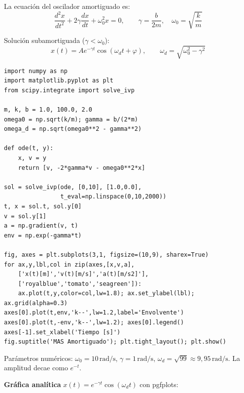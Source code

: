\documentclass[12pt, a4paper, oneside]{book}
\newcommand{\ddt}[1]{\dfrac{d#1}{dt}}
\newcommand{\dddt}[1]{\dfrac{d^{2}#1}{dt^{2}}}
\newcommand{\rad}{\,\text{rad/s}}
\begin{document}
\begin{solucion}
La ecuaci\'on del oscilador amortiguado es:
\[
  \dddt{x} + 2\gamma\ddt{x} + \omega_{0}^{2}x = 0,\qquad
  \gamma = \dfrac{b}{2m},\quad \omega_{0} = \sqrt{\dfrac{k}{m}}
\]

Soluci\'on subamortiguada ($\gamma < \omega_{0}$):
\[
  x(t) = Ae^{-\gamma t}\cos(\omega_{d}t + \varphi),\qquad
  \omega_{d} = \sqrt{\omega_{0}^{2}-\gamma^{2}}
\]

\begin{lstlisting}[caption={MAS amortiguado --- Problema 18}]
import numpy as np
import matplotlib.pyplot as plt
from scipy.integrate import solve_ivp

m, k, b = 1.0, 100.0, 2.0
omega0 = np.sqrt(k/m); gamma = b/(2*m)
omega_d = np.sqrt(omega0**2 - gamma**2)

def ode(t, y):
    x, v = y
    return [v, -2*gamma*v - omega0**2*x]

sol = solve_ivp(ode, [0,10], [1.0,0.0],
                t_eval=np.linspace(0,10,2000))
t, x = sol.t, sol.y[0]
v = sol.y[1]
a = np.gradient(v, t)
env = np.exp(-gamma*t)

fig, axes = plt.subplots(3,1, figsize=(10,9), sharex=True)
for ax,y,lbl,col in zip(axes,[x,v,a],
    ['x(t)[m]','v(t)[m/s]','a(t)[m/s2]'],
    ['royalblue','tomato','seagreen']):
    ax.plot(t,y,color=col,lw=1.8); ax.set_ylabel(lbl); ax.grid(alpha=0.3)
axes[0].plot(t,env,'k--',lw=1.2,label='Envolvente')
axes[0].plot(t,-env,'k--',lw=1.2); axes[0].legend()
axes[-1].set_xlabel('Tiempo [s]')
fig.suptitle('MAS Amortiguado'); plt.tight_layout(); plt.show()
\end{lstlisting}

\begin{resultado}
Par\'ametros num\'ericos: $\omega_{0} = 10\rad$, $\gamma = 1\rad$,
$\omega_{d} = \sqrt{99} \approx 9{,}95\rad$. La amplitud decae como $e^{-t}$.
\end{resultado}

\medskip
\textbf{Gr\'afica anal\'itica} $x(t)=e^{-\gamma t}\cos(\omega_d t)$ con pgfplots:

\begin{center}
\end{center}
\end{solucion}
\end{document}

